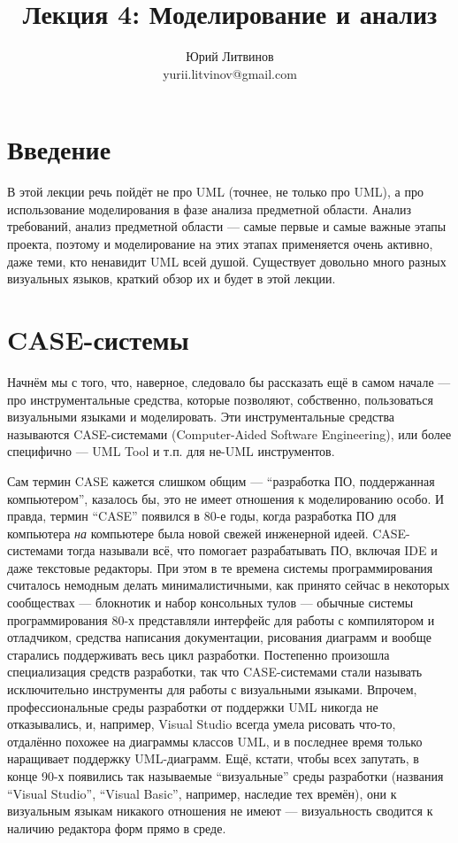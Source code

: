 \documentclass[a5paper]{article}
\title{Лекция 4:  Моделирование и анализ}
\author{Юрий Литвинов\\\small{yurii.litvinov@gmail.com}}
\date{}
\begin{document}
\maketitle
\thispagestyle{empty}

\section{Введение}

В этой лекции речь пойдёт не про UML (точнее, не только про UML), а про использование моделирования в фазе анализа предметной области. Анализ требований, анализ предметной области --- самые первые и самые важные этапы проекта, поэтому и моделирование на этих этапах применяется очень активно, даже теми, кто ненавидит UML всей душой. Существует довольно много разных визуальных языков, краткий обзор их и будет в этой лекции.

\section{CASE-системы}

Начнём мы с того, что, наверное, следовало бы рассказать ещё в самом начале --- про инструментальные средства, которые позволяют, собственно, пользоваться визуальными языками и моделировать. Эти инструментальные средства называются CASE-системами (Computer-Aided Software Engineering), или более специфично --- UML Tool и т.п. для не-UML инструментов. 

Сам термин CASE кажется слишком общим --- ``разработка ПО, поддержанная компьютером'', казалось бы, это не имеет отношения к моделированию особо. И правда, термин ``CASE'' появился в 80-е годы, когда разработка ПО для компьютера \textit{на} компьютере была новой свежей инженерной идеей. CASE-системами тогда называли всё, что помогает разрабатывать ПО, включая IDE и даже текстовые редакторы. При этом в те времена системы программирования считалось немодным делать минималистичными, как принято сейчас в некоторых сообществах --- блокнотик и набор консольных тулов --- обычные системы программирования 80-х представляли интерфейс для работы с компилятором и отладчиком, средства написания документации, рисования диаграмм и вообще старались поддерживать весь цикл разработки. Постепенно произошла специализация средств разработки, так что CASE-системами стали называть исключительно инструменты для работы с визуальными языками. Впрочем, профессиональные среды разработки от поддержки UML никогда не отказывались, и, например, Visual Studio всегда умела рисовать что-то, отдалённо похожее на диаграммы классов UML, и в последнее время только наращивает поддержку UML-диаграмм. Ещё, кстати, чтобы всех запутать, в конце 90-х появились так называемые ``визуальные'' среды разработки (названия ``Visual Studio'', ``Visual Basic'', например, наследие тех времён), они к визуальным языкам никакого отношения не имеют --- визуальность сводится к наличию редактора форм прямо в среде.
\end{document}

